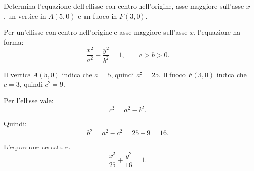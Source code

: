 
\begin{esercizio}
Determina l'equazione dell'ellisse con centro nell'origine, asse maggiore
sull'asse $x$, un vertice in $A(5,0)$ e un fuoco in $F(3,0)$.
\end{esercizio}

\begin{soluzione}
Per un'ellisse con centro nell'origine e asse maggiore sull'asse $x$,
l'equazione ha forma:
\[
\frac{x^2}{a^2}+\frac{y^2}{b^2}=1,
\qquad a>b>0.
\]

Il vertice $A(5,0)$ indica che $a=5$, quindi $a^2=25$.
Il fuoco $F(3,0)$ indica che $c=3$, quindi $c^2=9$.

Per l'ellisse vale:
\[
c^2=a^2-b^2.
\]

Quindi:
\[
b^2=a^2-c^2=25-9=16.
\]

L'equazione cercata e:
\[
\frac{x^2}{25}+\frac{y^2}{16}=1.
\]
\end{soluzione}

